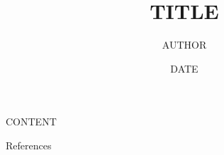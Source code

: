 \documentclass[aspectratio=169]{beamer}
\title{{{TITLE}}}
\author{{{AUTHOR}}}
\date{{{DATE}}}
\begin{document}
\begin{frame}
  \titlepage
\end{frame}

{{CONTENT}}

\begin{frame}[allowframebreaks]{References}


\end{frame}
\end{document}
